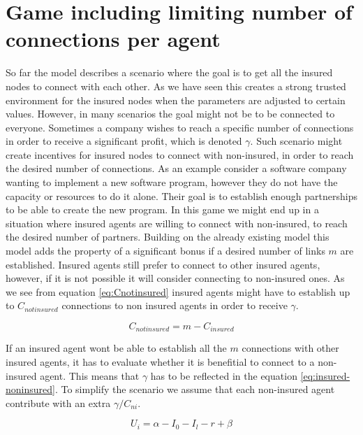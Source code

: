 
\section{Game including limiting number of connections per agent}
So far the model describes a scenario where the goal is to get all the insured nodes to connect with each other. As we have seen this creates a strong trusted environment for the insured nodes when the parameters are adjusted to certain values. However, in many scenarios the goal might not be to be connected to everyone. Sometimes a company wishes to reach a specific number of connections in order to receive a significant profit, which is denoted $\gamma$. Such scenario might create incentives for insured nodes to connect with non-insured, in order to reach the desired number of connections. As an example consider a software company wanting to implement a new software program, however they do not have the capacity or resources to do it alone. Their goal is to establish enough partnerships to be able to create the new program. In this game we might end up in a situation where insured agents are willing to connect with non-insured, to reach the desired number of partners. Building on the already existing model this model adds the property of a significant bonus if a desired number of links $m$ are established. Insured agents still prefer to connect to other insured agents, however, if it is not possible it will consider connecting to non-insured ones. As we see from equation \ref{eq:Cnotinsured} insured agents might have to establish up to $C_{not insured}$ connections to non insured agents in order to receive $\gamma$.

\begin{equation} 
C_{not insured} = m - C_{insured} 
\label{eq:Cnotinsured}
\end{equation}

If an insured agent wont be able to establish all the $m$ connections with other insured agents, it has to evaluate whether it is benefitial to connect to a non-insured agent. This means that $\gamma$ has to be reflected in the equation \ref{eq:insured-noninsured}. To simplify the scenario we assume that each non-insured agent contribute with an extra $\gamma / C_{ni}$.

\begin{equation}
U_{i}=\alpha - I_{0} - I_{l} - r + \beta 
\label{eq:insured-noninsured}
\end{equation}